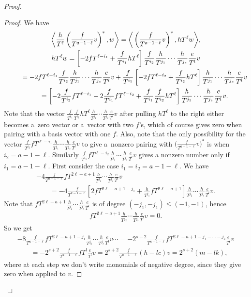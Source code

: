 \documentclass[pdftex]{sigma}
\numberwithin{equation}{section}
\begin{document}
\begin{proof}
\begin{proof}
We have
\begin{gather*}
\bigg\langle \frac{h}{T^\ell} \left(\frac{f}{T^{a-1-\ell}}v\right)^*, w \bigg\rangle = \bigg\langle \left(\frac{f}{T^{a-1-\ell}}v\right)^*, hT^{\ell} w \bigg\rangle,\\
hT^{\ell} w = \left[ -2fT^{\ell-i_1} + \frac{f}{T^{i_1}} hT^{\ell} \right] \frac{f}{T^{i_2}}\frac{h}{T^{j_1}} \cdots \frac{h}{T^{j_s}} \frac{e}{T^l} v \\
\hphantom{hT^{\ell} w} = -2fT^{\ell-i_1} \frac{f}{T^{i_2}}\frac{h}{T^{j_1}} \cdots \frac{h}{T^{j_s}} \frac{e}{T^l} v + \frac{f}{T^{i_1}} \left[ -2fT^{\ell-i_2} + \frac{f}{T^{i_2}} hT^{\ell} \right] \frac{h}{T^{j_1}} \cdots \frac{h}{T^{j_s}} \frac{e}{T^l} v \\
\hphantom{hT^{\ell} w} = \left[ -2 \frac{f}{T^{i_2}} fT^{\ell-i_1} - 2 \frac{f}{T^{i_1}}fT^{\ell-i_2} + \frac{f}{T^{i_1}} \frac{f}{T^{i_2}} hT^{\ell} \right] \frac{h}{T^{j_1}} \cdots \frac{h}{T^{j_s}} \frac{e}{T^l} v.
\end{gather*}
Note that the vector $\frac{f}{T^{i_1}} \frac{f}{T^{i_2}} hT^{\ell} \frac{h}{T^{j_1}} \cdots \frac{h}{T^{j_s}} \frac{e}{T^l} v$ after pulling $hT^{\ell}$ to the right either becomes a~zero vector or a~vector with two $f$'s, which of course gives zero when pairing with a basis vector with one $f$. Also, note that the only possibility for the vector $\frac{f}{T^{i_2}} fT^{\ell-i_1} \frac{h}{T^{j_1}} \cdots \frac{h}{T^{j_s}} \frac{e}{T^l} v$ to give a~nonzero pairing with $\big(\frac{f}{T^{a-1-\ell}}v\big)^*$ is when $i_2 = a-1-\ell$. Similarly $\frac{f}{T^{i_1}} fT^{\ell-i_2} \frac{h}{T^{j_1}} \cdots \frac{h}{T^{j_s}} \frac{e}{T^l} v$ gives a nonzero number only if $i_1 = a-1-\ell$. First consider the case $i_1=i_2=a-1-\ell$. We have
\begin{gather*}
- 4 \frac{f}{T^{a-1-\ell}} fT^{2\ell-a+1} \frac{h}{T^{j_1}} \cdots \frac{h}{T^{j_s}} \frac{e}{T^l} v \\
\qquad{} = - 4 \frac{f}{T^{a-1-\ell}} \left[ 2 fT^{2\ell-a+1-j_1} + \frac{h}{T^{j_1}} fT^{2\ell-a+1} \right] \frac{h}{T^{j_2}} \cdots \frac{h}{T^{j_s}} \frac{e}{T^l} v.
\end{gather*}
Note that $fT^{2\ell-a+1} \frac{h}{T^{j_2}} \cdots \frac{h}{T^{j_s}} \frac{e}{T^l}$ is of degree $(-j_1,-j_1) \leq (-1,-1)$, hence
\begin{gather*} fT^{2\ell-a+1} \frac{h}{T^{j_2}} \cdots \frac{h}{T^{j_s}} \frac{e}{T^l} v =0.\end{gather*} So we get
\begin{gather*}
 -8 \frac{f}{T^{a-1-\ell}} fT^{2\ell-a+1-j_1} \frac{h}{T^{j_2}} \cdots \frac{h}{T^{j_s}} \frac{e}{T^l} v \cdots
 = -2^{s+2} \frac{f}{T^{a-1-\ell}} fT^{2\ell-a+1-j_1-\cdots-j_s} \frac{e}{T^l} v \\
\qquad{} = - 2^{s+2} \frac{f}{T^{a-1-\ell}} fT^{l} \frac{e}{T^l} v = 2^{s+2} \frac{f}{T^{a-1-\ell}} (h - lc) v = 2^{s+2} (m - lk),
\end{gather*}
where at each step we don't write monomials of negative degree, since they give zero when applied to $v$.


\end{proof}
\end{proof}
\end{document}
